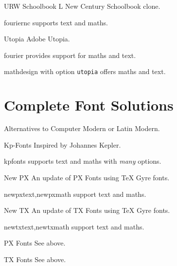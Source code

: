 \documentclass[a4paper,welsh,british,twocolumn]{article}
\begin{document}
\begin{fontopts}
  \item[URW Schoolbook L] New Century Schoolbook clone.
  \begin{pkgdescription}
    \item[fouriernc] supports text and maths.
  \end{pkgdescription}
  \item[Utopia] Adobe Utopia.
  \begin{pkgdescription}
    \item[fourier] provides support for maths and text.
	\item[mathdesign] with option \verb|utopia| offers maths and text.
  \end{pkgdescription}
\end{fontopts}
\section{Complete Font Solutions}\label{sec:complete}
Alternatives to Computer Modern or Latin Modern.
\begin{fontopts}
  \item[Kp-Fonts] Inspired by Johannes Kepler.
  \begin{pkgdescription}
    \item[kpfonts] supports text and maths with \emph{many} options.
  \end{pkgdescription}
  \item[New PX] An update of PX Fonts using TeX Gyre fonts.
  \begin{pkgdescription}
    \item[newpxtext,newpxmath] support text and maths.
  \end{pkgdescription}
  \item[New TX] An update of TX Fonts using TeX Gyre fonts.
  \begin{pkgdescription}
    \item[newtxtext,newtxmath] support text and maths.
  \end{pkgdescription}
  \item[PX Fonts] See  above.
  \item[TX Fonts] See  above.
\end{fontopts}
\end{document}
